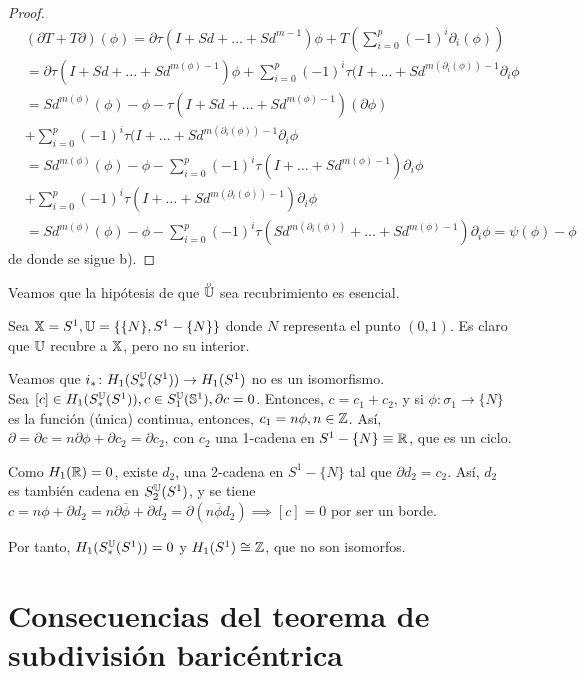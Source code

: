 \begin{proof}
  \begin{align*}
    &(\partial T + T \partial)(\phi) = \partial \tau(I + Sd + \dots + Sd^{m-1}) \phi + T(\sum\limits_{i = 0}^p (-1)^i \partial_i(\phi)) \\
    &= \partial \tau(I + Sd + \dots + Sd^{m(\phi)-1}) \phi + \sum\limits_{i = 0}^p (-1)^i \tau(I + \dots + Sd^{m(\partial_i(\phi)) - 1} \partial_i \phi \\
    &= Sd^{m(\phi)}(\phi) - \phi - \tau(I + Sd + \dots + Sd^{m(\phi)-1})(\partial \phi)  \\
    &+ \sum\limits_{i = 0}^p (-1)^i \tau(I + \dots + Sd^{m(\partial_i(\phi)) - 1} \partial_i \phi \\
    &= Sd^{m(\phi)}(\phi) - \phi - \sum\limits_{i = 0}^p (-1)^i \tau(I + \dots + Sd^{m(\phi) - 1}) \partial_i \phi \\
    &+ \sum\limits_{i = 0}^p (-1)^i \tau(I + \dots + Sd^{m(\partial_i(\phi)) - 1}) \partial_i \phi \\
    &= Sd^{m(\phi)}(\phi) - \phi - \sum\limits_{i = 0}^p (-1)^i \tau(Sd^{m(\partial_i(\phi))} + \dots + Sd^{m(\phi) - 1}) \partial_i \phi = \psi(\phi) - \phi
  \end{align*}
  de donde se sigue b).
\end{proof}

Veamos que la hipótesis de que $\interior{\U}$ sea recubrimiento es esencial.

Sea ${\mathbb X} = S^1, {\mathbb U} = \{\{N\}, S^1 - \{N\}\}$ donde $N$ representa el punto $(0, 1)$. Es claro que ${\mathbb U}$ recubre a ${\mathbb X}$, pero no su interior.

Veamos que $i_* \colon H_1(S_*^{\mathbb U}(S^1)) \to H_1(S^1)$ no es un isomorfismo. \\
Sea $[c] \in H_1(S_*^{\mathbb U}(S^1)), c \in S_1^{\mathbb U}({\mathbb S}^1), \partial c = 0$. Entonces, $c = c_1 + c_2$, y si $\phi \colon \sigma_1 \to \{N\}$ es la función
(única) continua, entonces, $c_1 = n\phi, n \in \mathbb{Z}$. Así, $\partial = \partial c = n \partial \phi + \partial c_2 = \partial c_2$, con $c_2$ una
1-cadena en $S^1 - \{N\} \equiv \mathbb{R}$, que es un ciclo.

Como $H_1(\mathbb{R}) = 0$, existe $d_2$, una 2-cadena en $S^1 - \{N\}$ tal que $\partial d_2 = c_2$. Así, $d_2$ es también cadena en $S_2^{\mathbb U}(S^1)$, y se tiene
$c = n\phi + \partial d_2 = n \partial \overline{\phi} + \partial d_2 = \partial(n\overline{\phi}  d_2) \implies [c] = 0$ por ser un borde.

Por tanto, $H_1(S_*^{\mathbb U}(S^1)) = 0$ y $H_1(S^1) \cong \mathbb{Z}$, que no son isomorfos.

\section{Consecuencias del teorema de subdivisión baricéntrica}


